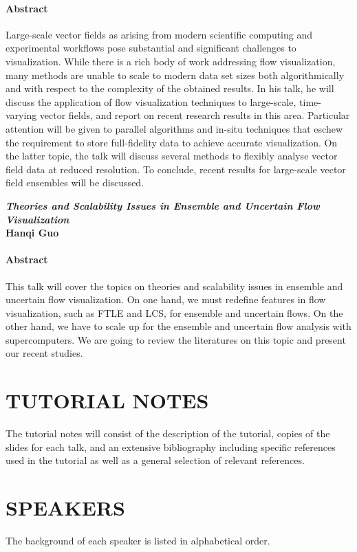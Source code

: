 \documentclass[preprint,journal]{vgtc}       %
\newcommand{\addverticalspace}{\vspace{3mm}}
\begin{document}
\paragraph{Abstract}
Large-scale vector fields as arising from modern scientific computing and experimental workflows pose substantial and significant challenges to visualization. While there is a rich body of work addressing flow visualization, many methods are unable to scale to modern data set sizes both algorithmically and with respect to the complexity of the obtained results. In his talk, he will discuss the application of flow visualization techniques to large-scale, time-varying vector fields, and report on recent research results in this area. Particular attention will be given to parallel algorithms and in-situ techniques that eschew the requirement to store full-fidelity data to achieve accurate visualization. On the latter topic, the talk will discuss several methods to flexibly analyse vector field data at reduced resolution. To conclude, recent results for large-scale vector field ensembles will be discussed.

\addverticalspace

\noindent\textbf{\textit{Theories and Scalability Issues in Ensemble and Uncertain Flow Visualization}}\\
\textbf{Hanqi Guo}
\paragraph{Abstract}
This talk will cover the topics on theories and scalability issues in ensemble and uncertain flow visualization. On one hand, we must redefine features in flow visualization, such as FTLE and LCS, for ensemble and uncertain flows. On the other hand, we have to scale up for the ensemble and uncertain flow analysis with supercomputers. We are going to review the literatures on this topic and present our recent studies.

\section*{TUTORIAL NOTES}
The tutorial notes will consist of the description of the tutorial, copies of the slides for each talk, and an extensive bibliography including specific references used in the tutorial as well as a general selection of relevant references.

\section*{SPEAKERS}
The background of each speaker is listed in alphabetical order.
\end{document}

